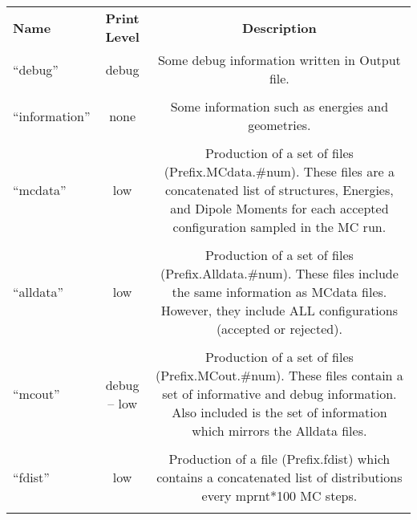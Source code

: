 \begin{table}[htbp!]
\begin{center}
\begin{tabular}{lcc}
  {\bf Name}          & {\bf Print Level} & {\bf Description} \\
``debug'' &      debug & \begin{minipage}{0.6\textwidth}Some debug
information written in Output
file.\end{minipage} \\
\\
``information'' & none & \begin{minipage}{0.6\textwidth}Some
information such as energies and
geometries.\end{minipage}\\
\\
``mcdata'' & low & \begin{minipage}{0.6\textwidth} Production of a
set of files (Prefix.MCdata.\#num). These files are a concatenated
list of structures, Energies, and Dipole Moments for each accepted
configuration sampled in the MC run.\end{minipage}\\
\\
``alldata'' & low & \begin{minipage}{0.6\textwidth}Production of a
set of files (Prefix.Alldata.\#num).  These files include the same
information as MCdata files.  However, they include ALL
configurations (accepted or
rejected).\end{minipage}\\
\\
``mcout'' & debug -- low  &
\begin{minipage}{0.6\textwidth}Production of a set of files
(Prefix.MCout.\#num).  These files contain a set of informative and
debug information.  Also included is the set of information which
mirrors the Alldata files.\end{minipage}\\
\\
``fdist'' & low & \begin{minipage}{0.6\textwidth}Production of a
file (Prefix.fdist) which contains
a concatenated list of distributions every mprnt*100 MC steps.\end{minipage}\\
\\
\end{tabular}
\end{center}
\end{table}

